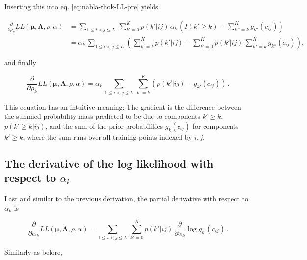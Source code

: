 \documentclass[11pt,a4paper,twoside]{book}
\newcommand{\cij}{c_{ij}}
\theoremstyle{definition}
\theoremstyle{definition}
\theoremstyle{remark}
\begin{document}
Inserting this into eq. \eqref{eq:nabla-rhok-LL-pre} yields

\begin{align}
    \frac{\partial} {\partial \rho_k}  L\!L(\mathbf{\mu}, \mathbf{\Lambda}, \rho, \alpha)  
    &= \sum_{1\le i<j\le L}  \, \sum_{k'=0}^K  p(k'|ij) \, \alpha_k \, \left(  I(k' \ge k)  -  \sum_{k''=k}^K  g_{k''}(\cij) \right)  \nonumber \\
    &= \alpha_k \, \sum_{1\le i<j\le L}  \, \left( \sum_{k'=k}^K  p(k'|ij)   -  \sum _{k'=0}^K  p(k'|ij) \, \sum_{k''=k}^K  g_{k''}(\cij)  \right) ,
\end{align}

and finally

\begin{equation}
    \frac{\partial} {\partial \rho_k}  L\!L(\mathbf{\mu}, \mathbf{\Lambda}, \rho, \alpha)  = \alpha_k \, \sum_{1\le i<j\le L}  \, \sum_{k'=k}^K  ( p(k'|ij) - g_{k'}(\cij) )  \, .
\end{equation}

This equation has an intuitive meaning: The gradient is the difference
between the summed probability mass predicted to be due to components
\(k' \ge k\), \(p(k'\ge k | ij)\), and the sum of the prior
probabilities \(g_k(\cij)\) for components \(k' \ge k\), where the sum
runs over all training points indexed by \(i,j\).

\subsection{\texorpdfstring{The derivative of the log likelihood with
respect to
\(\alpha_k\)}{The derivative of the log likelihood with respect to \textbackslash{}alpha\_k}}\label{the-derivative-of-the-log-likelihood-with-respect-to-alpha_k}

Last and similar to the previous derivation, the partial derivative with
respect to \(\alpha_k\) is

\begin{equation}
  \frac{\partial} {\partial \alpha_k} L\!L(\mathbf{\mu}, \mathbf{\Lambda}, \rho, \alpha) = \sum_{1\le i<j\le L}  \, \sum_{k'=0}^K  p(k'|ij) \,  \frac{\partial} {\partial \alpha_k}  \log g_{k'}(\cij)  \,.
    \label{eq:nabla-alphak-LLpre}
\end{equation}

Similarly as before,
\end{document}
